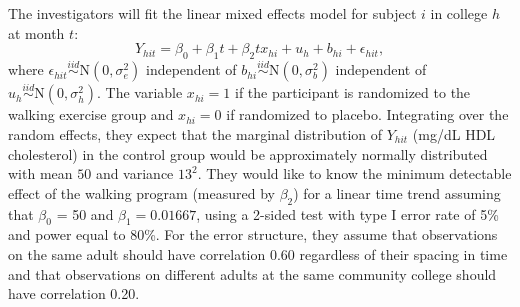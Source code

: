 																	\vspace{0.2cm}
																	The investigators will fit the linear mixed effects model for subject $i$ in college $h$ at month
																	$t$:
																	\[
																			Y_{hit} = \beta_0 + \beta_1t + \beta_2 t x_{hi} + u_h + b_{hi} + \epsilon_{hit},
																	\]
																	where $\epsilon_{hit} \overset{iid}{\sim} \text{N}\left(0,\sigma^2_e\right)$ independent of 
																	$b_{hi} \overset{iid}{\sim} \text{N}\left(0,\sigma^2_b\right)$ independent of 
																	$u_{h} \overset{iid}{\sim} \text{N}\left(0,\sigma^2_h\right)$. The variable $x_{hi} = 1$
																	if the participant is randomized to the walking exercise group and $x_{hi} = 0$ if randomized
																	to placebo.
																	Integrating over the random effects, they expect that the marginal distribution of $Y_{hit}$ (mg/dL HDL cholesterol) 
																	in the control group would be approximately normally distributed with mean $50$ and variance $13^2$. They would like to 
																	know the minimum detectable effect of the walking program (measured by $\beta_2$) for a linear time trend  
																	assuming that $\beta_0$ = 50 and $\beta_1 = 0.01667$, using a 2-sided test with type I error 
																	rate of 5\% and power equal to 80\%. For the error structure, they assume that observations on the same adult should have 
																	correlation 0.60 regardless of their spacing in time and that observations on different adults at the same community college 
																	should have correlation 0.20. \\
																	
